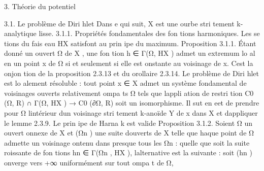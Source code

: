 \documentclass[
  10pt,
]{article}
\newenvironment{Shaded}{}{}
\newcommand{\NormalTok}[1]{#1}
\begin{document}
\begin{Shaded}
\begin{Highlighting}[]
\NormalTok{                              3. Théorie du potentiel}



\NormalTok{                              3.1. Le problème de Diri hlet}
\NormalTok{  Dans e qui suit, X est une ourbe stri tement k{-}analytique lisse.}
\NormalTok{3.1.1. Propriétés fondamentales des fon tions harmoniques.}
\NormalTok{  Les se tions du fais eau HX satisfont au prin ipe du maximum.}
\NormalTok{Proposition 3.1.1.  Étant donné un ouvert Ω de X , une fon tion h ∈ Γ(Ω, HX ) admet}
\NormalTok{un extremum lo al en un point x de Ω si et seulement si elle est onstante au voisinage de x.}
\NormalTok{  C\textquotesingle{}est la onjon tion de la proposition 2.3.13 et du orollaire 2.3.14.}
\NormalTok{   Le problème de Diri hlet est lo alement résoluble : tout point x ∈ X admet un système}
\NormalTok{fondamental de voisinages ouverts relativement ompa ts Ω tels que l\textquotesingle{}appli ation de restri tion}
\NormalTok{                              C0 (Ω, R) ∩ Γ(Ω, HX ) → C0 (∂Ω, R)}
\NormalTok{soit un isomorphisme. Il sut en eet de prendre pour Ω l\textquotesingle{}intérieur d\textquotesingle{}un voisinage stri tement}
\NormalTok{k{-}anoïde Y de x dans X et d\textquotesingle{}appliquer le lemme 2.3.9.}
\NormalTok{  Le prin ipe de Harna k est valide}
\NormalTok{Proposition 3.1.2.  Soient Ω un ouvert onnexe de X et (Ωn ) une suite d\textquotesingle{}ouverts de}
\NormalTok{X telle que haque point de Ω admette un voisinage ontenu dans presque tous les Ωn : quelle}
\NormalTok{que soit la suite roissante de fon tions hn ∈ Γ(Ωn , HX ), l\textquotesingle{}alternative est la suivante :}
\NormalTok{   soit (hn ) onverge vers +∞ uniformément sur tout ompa t de Ω,}


\end{Highlighting}
\end{Shaded}
\end{document}
